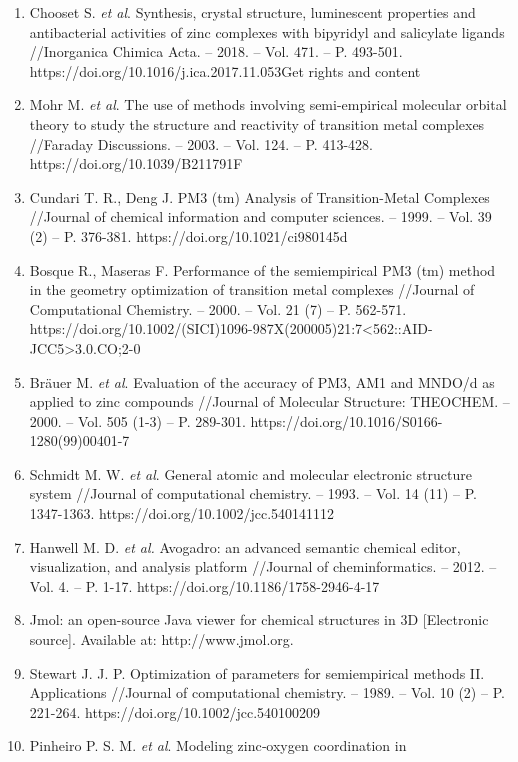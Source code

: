 \begin{enumerate}
\item
  Chooset S. \emph{et al}. Synthesis, crystal structure, luminescent
  properties and antibacterial activities of zinc complexes with
  bipyridyl and salicylate ligands //Inorganica Chimica Acta. -- 2018.
  -- Vol. 471. -- P. 493-501.
  https://doi.org/10.1016/j.ica.2017.11.053Get rights and content
\item
  Mohr M. \emph{et al}. The use of methods involving semi-empirical
  molecular orbital theory to study the structure and reactivity of
  transition metal complexes //Faraday Discussions. -- 2003. -- Vol.
  124. -- P. 413-428. https://doi.org/10.1039/B211791F
\item
  Cundari T. R., Deng J. PM3 (tm) Analysis of Transition-Metal Complexes
  //Journal of chemical information and computer sciences. -- 1999. --
  Vol. 39 (2) -- P. 376-381. https://doi.org/10.1021/ci980145d
\item
  Bosque R., Maseras F. Performance of the semiempirical PM3 (tm) method
  in the geometry optimization of transition metal complexes //Journal
  of Computational Chemistry. -- 2000. -- Vol. 21 (7) -- P. 562-571.
  https://doi.org/10.1002/(SICI)1096-987X(200005)21:7\textless562::AID-JCC5\textgreater3.0.CO;2-0
\item
  Bräuer M. \emph{et al}. Evaluation of the accuracy of PM3, AM1 and
  MNDO/d as applied to zinc compounds //Journal of Molecular Structure:
  THEOCHEM. -- 2000. -- Vol. 505 (1-3) -- P. 289-301.
  https://doi.org/10.1016/S0166-1280(99)00401-7
\item
  Schmidt M. W. \emph{et al}. General atomic and molecular electronic
  structure system //Journal of computational chemistry. -- 1993. --
  Vol. 14 (11) -- P. 1347-1363. https://doi.org/10.1002/jcc.540141112
\item
  Hanwell M. D. \emph{et al.} Avogadro: an advanced semantic chemical
  editor, visualization, and analysis platform //Journal of
  cheminformatics. -- 2012. -- Vol. 4. -- P. 1-17.
  https://doi.org/10.1186/1758-2946-4-17
\item
  Jmol: an open-source Java viewer for chemical structures in 3D
  {[}Electronic source{]}. Available at: http://www.jmol.org.
\item
  Stewart J. J. P. Optimization of parameters for semiempirical methods
  II. Applications //Journal of computational chemistry. -- 1989. --
  Vol. 10 (2) -- P. 221-264. https://doi.org/10.1002/jcc.540100209
\item
  Pinheiro P. S. M. \emph{et al}. Modeling zinc‐oxygen coordination in

\end{enumerate}
